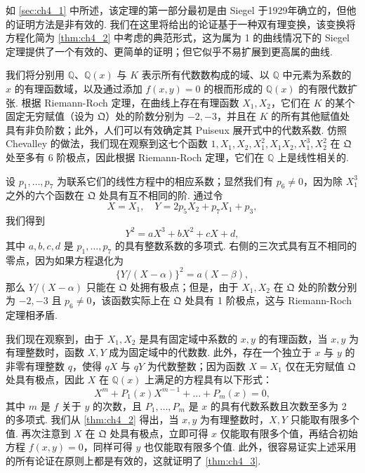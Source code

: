 如 \autoref{sec:ch4_1} 中所述，该定理的第一部分最初是由 Siegel 于1929年确立的，但他的证明方法是非有效的. 我们在这里将给出的论证基于一种双有理变换，该变换将方程化简为 \autoref{thm:ch4_2} 中考虑的典范形式，这为属为 1 的曲线情况下的 Siegel 定理提供了一个有效的、更简单的证明；但它似乎不易扩展到更高属的曲线.

我们将分别用 $\mathbb{Q}$、$\mathbb{Q}(x)$ 与 $K$ 表示所有代数数构成的域、以 $\mathbb{Q}$ 中元素为系数的 $x$ 的有理函数域，以及通过添加 $f(x, y) = 0$ 的根而形成的 $\mathbb{Q}(x)$ 的有限代数扩张. 根据 Riemann-Roch 定理，在曲线上存在有理函数 $X_1, X_2$，它们在 $K$ 的某个固定无穷赋值（设为 $\mathfrak{Q}$）处的阶数分别为 $-2, -3$，并且在 $K$ 的所有其他赋值处具有非负阶数；此外，人们可以有效确定其 Puiseux 展开式中的代数系数. 仿照 Chevalley 的做法，我们现在观察到这七个函数 $1, X_1, X_2, X_1^2, X_1 X_2, X_1^3, X_2^2$ 在 $\mathfrak{Q}$ 处至多有 6 阶极点，因此根据 Riemann-Roch 定理，它们在 $\mathbb{Q}$ 上是线性相关的.

设 $p_1, \dots, p_7$ 为联系它们的线性方程中的相应系数；显然我们有 $p_6 \neq 0$，因为除 $X_1^3$ 之外的六个函数在 $\mathfrak{Q}$ 处具有互不相同的阶. 通过令
\[
X = X_1, \quad Y = 2p_5 X_2 + p_7 X_1 + p_3,
\]
我们得到
\[
Y^2 = aX^3 + bX^2 + cX + d,
\]
其中 $a, b, c, d$ 是 $p_1, \dots, p_7$ 的具有整数系数的多项式. 右侧的三次式具有互不相同的零点，因为如果方程退化为
\[
\{Y/(X-\alpha)\}^2=a(X-\beta),
\]
那么 $Y/(X - \alpha)$ 只能在 $\mathfrak{Q}$ 处拥有极点；但是，由于 $X_1, X_2$ 在 $\mathfrak{Q}$ 处的阶数分别为 $-2, -3$ 且 $p_6 \neq 0$，该函数实际上在 $\mathfrak{Q}$ 处具有 1 阶极点，这与 Riemann-Roch 定理相矛盾.

我们现在观察到，由于 $X_1, X_2$ 是具有固定域中系数的 $x, y$ 的有理函数，当 $x, y$ 为有理整数时，函数 $X, Y$ 成为固定域中的代数数. 此外，存在一个独立于 $x$ 与 $y$ 的非零有理整数 $q$，使得 $qX$ 与 $qY$ 为代数整数；因为函数 $X = X_1$ 仅在无穷赋值 $\mathfrak{Q}$ 处具有极点，因此 $X$ 在 $\mathbb{Q}(x)$ 上满足的方程具有以下形式：
\[
X^m + P_1(x) X^{m-1} + \dots + P_m(x) = 0,
\]
其中 $m$ 是 $f$ 关于 $y$ 的次数，且 $P_1, \dots, P_m$ 是 $x$ 的具有代数系数且次数至多为 2 的多项式. 我们从 \autoref{thm:ch4_2} 得出，当 $x, y$ 为有理整数时，$X, Y$ 只能取有限多个值. 再次注意到 $X$ 在 $\mathfrak{Q}$ 处具有极点，立即可得 $x$ 仅能取有限多个值，再结合初始方程 $f(x, y) = 0$，同样可得 $y$ 也仅能取有限多个值. 此外，很容易证实上述采用的所有论证在原则上都是有效的，这就证明了 \autoref{thm:ch4_3}.

